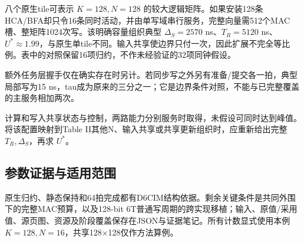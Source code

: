 八个原生tile可表示 $K=128,N=128$ 的较大逻辑矩阵。如果安装128条HCA/BFA却只令16条同时活动，并由单写域串行服务，完整向量需512个MAC槽、整矩阵1024次写。该明确容量组织典型 $\Delta_S=2570$ ns、$T_R=5120$ ns、$U^*\approx1.99$，与原生单tile不同。输入共享使边界只付一次，因此扩展不完全等比例。表中的对照保留16项归约，不作未经验证的32项同钟假设。



额外任务层握手仅在确实存在时另计。若同步写之外另有准备/提交各一拍，典型局部写为15 ns，tau成为原来的三分之一；它是边界条件对照，不能与已完整覆盖的主服务相加两次。

计算和写入共享状态与控制，两路能力分别服务时取得，未假设可同时达到峰值。将该配置映射到Table II其他N、输入共享或共享更新组织时，应重新给出完整 $T_R,\Delta_S$，再求 $U^*$。

\subsection{参数证据与适用范围}

原生归约、静态保持和64拍完成都有D6CIM结构依据。剩余关键条件是共同外围下的完整MAC预算，以及128-bit 6T普通写周期的跨实现移植；输入、原值/采用值、源页图、资源及阶段覆盖保存在JSON与证据笔记。所有计数显式使用本例 $K=128,N=16$，共享128×128仅作方法算例。


